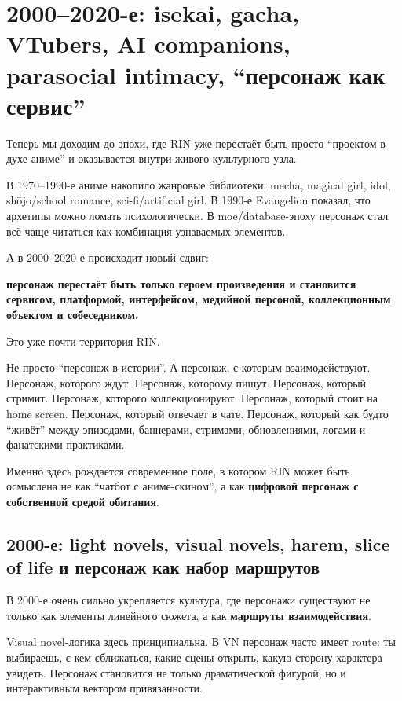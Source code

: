 \section{2000–2020-е: isekai, gacha, VTubers, AI companions, parasocial intimacy, “персонаж как сервис”}

Теперь мы доходим до эпохи, где RIN уже перестаёт быть просто ``проектом
в духе аниме'' и оказывается внутри живого культурного узла.

В 1970--1990-е аниме накопило жанровые библиотеки: mecha, magical girl,
idol, shōjo/\hspace{0pt}school romance, sci-fi/\hspace{0pt}artificial girl. В 1990-е Evangelion
показал, что архетипы можно ломать психологически. В moe/\hspace{0pt}database-эпоху
персонаж стал всё чаще читаться как комбинация узнаваемых элементов.

А в 2000--2020-е происходит новый сдвиг:

\textbf{персонаж перестаёт быть только героем произведения и становится
сервисом, платформой, интерфейсом, медийной персоной, коллекционным
объектом и собеседником.}

Это уже почти территория RIN.

Не просто ``персонаж в истории''. А персонаж, с которым взаимодействуют.
Персонаж, которого ждут. Персонаж, которому пишут. Персонаж, который
стримит. Персонаж, которого коллекционируют. Персонаж, который стоит на
home screen. Персонаж, который отвечает в чате. Персонаж, который как
будто ``живёт'' между эпизодами, баннерами, стримами, обновлениями,
логами и фанатскими практиками.

Именно здесь рождается современное поле, в котором RIN может быть
осмыслена не как ``чатбот с аниме-скином'', а как \textbf{цифровой
персонаж с собственной средой обитания}.

\subsection*{2000-е: light novels, visual novels, harem, slice of life и
персонаж как набор маршрутов}

В 2000-е очень сильно укрепляется культура, где персонажи существуют не
только как элементы линейного сюжета, а как \textbf{маршруты
взаимодействия}.

Visual novel-логика здесь принципиальна. В VN персонаж часто имеет
route: ты выбираешь, с кем сближаться, какие сцены открыть, какую
сторону характера увидеть. Персонаж становится не только драматической
фигурой, но и интерактивным вектором привязанности.

